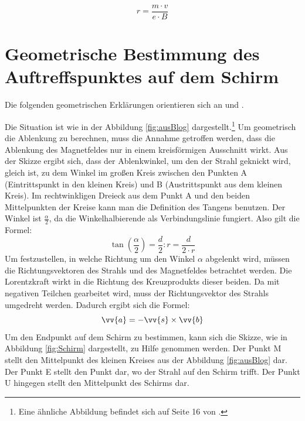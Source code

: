 \begin{equation}
     \label{eq:r}
     r = \frac{m \cdot v}{e \cdot B}
\end{equation}

\section{Geometrische Bestimmung des Auftreffspunktes auf dem Schirm}
\label{sec:g}
Die folgenden geometrischen Erklärungen orientieren sich an \cite{Blog} und \cite{Gente1950}.

Die Situation ist wie in der Abbildung \ref{fig:ausBlog} dargestellt.\footnote{Eine ähnliche Abbildung befindet sich auf Seite 16 von \cite{Gente1950}.}
Um geometrisch die Ablenkung zu berechnen, muss die Annahme getroffen werden, dass die Ablenkung des Magnetfeldes nur in einem kreisförmigen Ausschnitt wirkt.
Aus der Skizze ergibt sich, dass der Ablenkwinkel, um den der Strahl geknickt wird, gleich ist, zu dem Winkel im großen Kreis zwischen den Punkten A (Eintrittspunkt in den kleinen Kreis) und B (Austrittspunkt aus dem kleinen Kreis).
Im rechtwinkligen Dreieck aus dem Punkt A und den beiden Mittelpunkten der Kreise kann man die Definition des Tangens benutzen.
Der Winkel ist $\frac{\alpha}{2}$, da die Winkelhalbierende als Verbindungslinie fungiert.
Also gilt die Formel:
\begin{equation}
    \label{eq:tan}
    \tan(\frac{\alpha}{2}) = \frac{d}{2}:r = \frac{d}{2 \cdot r}
\end{equation}
Um festzustellen, in welche Richtung um den Winkel $\alpha$ abgelenkt wird, müssen die Richtungsvektoren des Strahls und des Magnetfeldes betrachtet werden.
Die Lorentzkraft wirkt in die Richtung des Kreuzprodukts dieser beiden.
Da mit negativen Teilchen gearbeitet wird, muss der Richtungsvektor des Strahls umgedreht werden. Dadurch ergibt sich die Formel: \begin{equation}
    \label{eq:a}
    \vv{a} = - \vv{s}\times \vv{b}
\end{equation}
Um den Endpunkt auf dem Schirm zu bestimmen, kann sich die Skizze, wie in Abbildung \ref{fig:Schirm} dargestellt, zu Hilfe genommen werden.
Der Punkt M stellt den Mittelpunkt des kleinen Kreises aus der Abbildung \ref{fig:ausBlog} dar.
Der Punkt E stellt den Punkt dar, wo der Strahl auf den Schirm trifft.
Der Punkt U hingegen stellt den Mittelpunkt des Schirms dar.
